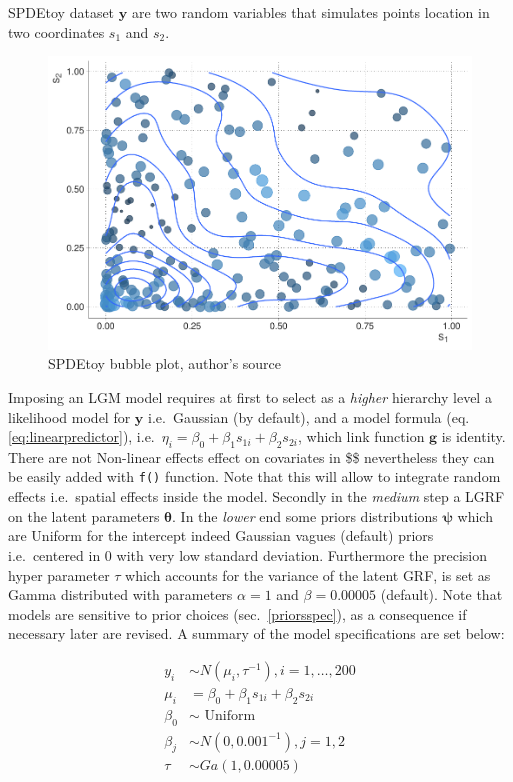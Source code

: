 \documentclass[
  12pt,
  a4paper,
  oneside]{book}
\newcommand{\passthrough}[1]{#1}
\theoremstyle{definition}
\theoremstyle{definition}
\theoremstyle{definition}
\theoremstyle{remark}
\begin{document}
SPDEtoy dataset \(\mathbf{y}\) are two random variables that simulates points location in two coordinates \(s_1\) and \(s_2\).

\begin{figure}
\centering
\includegraphics{04-inla_files/figure-latex/spatplot-1.pdf}
\caption{\label{fig:spatplot}SPDEtoy bubble plot, author's source}
\end{figure}

Imposing an LGM model requires at first to select as a \emph{higher} hierarchy level a likelihood model for \(\mathbf{y}\) i.e.~Gaussian (by default), and a model formula (eq. \eqref{eq:linearpredictor}), i.e.~\(\eta_{i}=\beta_{0}+\beta_{1} s_{1 i}+\beta_{2} s_{2 i}\), which link function \(\mathbf{g}\) is identity. There are not Non-linear effects effect on covariates in \$\eta \$ nevertheless they can be easily added with \passthrough{\lstinline!f()!} function. Note that this will allow to integrate random effects i.e.~spatial effects inside the model. Secondly in the \emph{medium} step a LGRF on the latent parameters \(\boldsymbol\theta\). In the \emph{lower} end some priors distributions \(\boldsymbol\psi\) which are Uniform for the intercept indeed Gaussian vagues (default) priors i.e.~centered in 0 with very low standard deviation. Furthermore the precision hyper parameter \(\tau\) which accounts for the variance of the latent GRF, is set as Gamma distributed with parameters \(\alpha = 1\) and \(\beta = 0.00005\) (default).
Note that models are sensitive to prior choices (sec.~\ref{priorsspec}), as a consequence if necessary later are revised.
A summary of the model specifications are set below:

\begin{equation} 
\begin{split}
y_{i} & \sim N\left(\mu_{i}, \tau^{-1}\right), i=1, \ldots, 200 \\
\mu_{i} &=\beta_{0}+\beta_{1} s_{1 i}+\beta_{2} s_{2 i} \\
\beta_{0} & \sim \text { Uniform } \\
\beta_{j} & \sim N\left(0,0.001^{-1}\right), j=1,2 \\
\tau & \sim G a(1,0.00005)
\end{split}
\end{equation}
\end{document}
